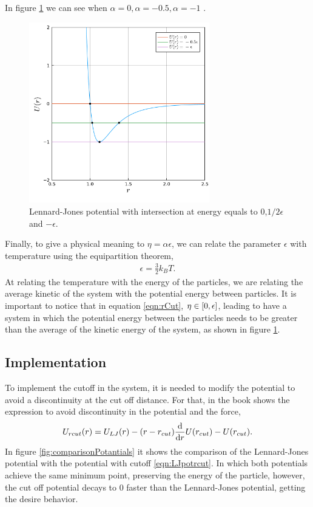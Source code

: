 \documentclass[main.tex]{subfiles}
\begin{document}
In figure \ref{fig:LJpotRcutoff} we can see when $\alpha = 0,\alpha=-0.5,\alpha=-1$ .
\begin{figure}[ht]
    \centering
    \includegraphics[width=0.7\textwidth]{imgs/hw2/LennarJonesDifferentEnergies.pdf}
    \caption{Lennard-Jones potential with intersection at energy equals to $0$,$1/2\epsilon$ and $-\epsilon$.}
    \label{fig:LJpotRcutoff}
\end{figure}

Finally, to give a physical meaning to $\eta=\alpha\epsilon$, we can relate the parameter $\epsilon$ with temperature using the equipartition theorem,
\begin{gather}
    \epsilon = \frac{3}{2}k_{B}T.
\end{gather}
At relating the temperature with the energy of the particles, we are relating the average kinetic of the system with the potential energy between particles.
It is important to notice that in equation \ref{eqn:rCut}, $\eta\in\qty[0,\epsilon]$, leading to have a system in which the potential energy between the particles needs to be greater than the average of the kinetic energy of the system, as shown in figure \ref{fig:LJpotRcutoff}.

\subsection{Implementation}

To implement the cutoff in the system, it is needed to modify the potential to avoid a discontinuity at the cut off distance.
For that, in the book \cite{libroClase} shows the expression to avoid discontinuity in the potential and the force,
\begin{gather}
    U_{rcut}\qty(r) = U_{LJ}\qty(r)-\qty(r-r_{cut})\dv{r}U\qty(r_{cut}) - U\qty(r_{cut}) \label{eqn:LJpotrcut}.
\end{gather}
In figure \ref{fig:comparisonPotantials} it shows the comparison of the Lennard-Jones potential with the potential with cutoff \ref{eqn:LJpotrcut}.
In which both potentials achieve the same minimum point, preserving the energy of the particle, however, the cut off potential decays to $0$ faster than the Lennard-Jones potential, getting the desire behavior.
\end{document}
